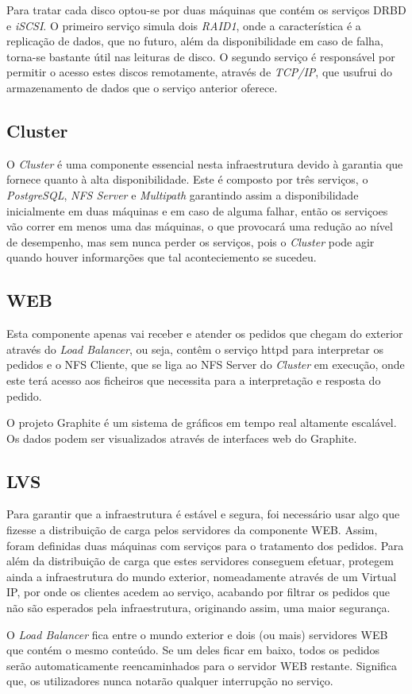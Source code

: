 Para tratar cada disco optou-se por duas máquinas que contém os serviços DRBD e \textit{iSCSI}. O primeiro serviço simula dois \textit{RAID1}, onde a característica é a replicação de dados, que no futuro, além da disponibilidade em caso de falha, torna-se bastante útil nas leituras de disco. O segundo serviço é responsável por permitir o acesso estes discos remotamente, através de \textit{TCP/IP}, que usufrui do armazenamento de dados que o serviço anterior oferece.

\subsection{Cluster}
O \textit{Cluster} é uma componente essencial nesta infraestrutura devido à garantia que fornece quanto à alta disponibilidade. Este é composto por três serviços, o \textit{PostgreSQL}, \textit{NFS Server} e \textit{Multipath} garantindo assim a disponibilidade inicialmente em duas máquinas e em caso de alguma falhar, então os serviçoes vão correr em menos uma das máquinas, o que provocará uma redução ao nível de desempenho, mas sem nunca perder os serviços, pois o \textit{Cluster} pode agir quando houver informarções que tal aconteciemento se sucedeu.

\subsection{WEB}
Esta componente apenas vai receber e atender os pedidos que chegam do exterior através do \textit{Load Balancer}, ou seja, contêm o serviço httpd para interpretar os pedidos e o NFS Cliente, que se liga ao NFS Server do \textit{Cluster} em execução, onde este terá acesso aos ficheiros que necessita para a interpretação e resposta do pedido.

O projeto Graphite é um sistema de gráficos em tempo real altamente escalável. Os dados podem ser visualizados através de interfaces web do Graphite.

\subsection{LVS}
Para garantir que a infraestrutura é estável e segura, foi necessário usar algo que fizesse a distribuição de carga pelos servidores da componente WEB. Assim, foram definidas duas máquinas com serviços para o tratamento dos pedidos. Para além da distribuição de carga que estes servidores conseguem efetuar, protegem ainda a infraestrutura do mundo exterior, nomeadamente através de um Virtual IP, por onde os clientes acedem ao serviço, acabando por filtrar os pedidos que não são esperados pela infraestrutura, originando assim, uma maior segurança.

O \textit{Load Balancer} fica entre o mundo exterior e dois (ou mais) servidores WEB que contém o mesmo conteúdo. Se um deles ficar em baixo, todos os pedidos serão automaticamente reencaminhados para o servidor WEB restante. Significa que, os utilizadores nunca notarão qualquer interrupção no serviço.

